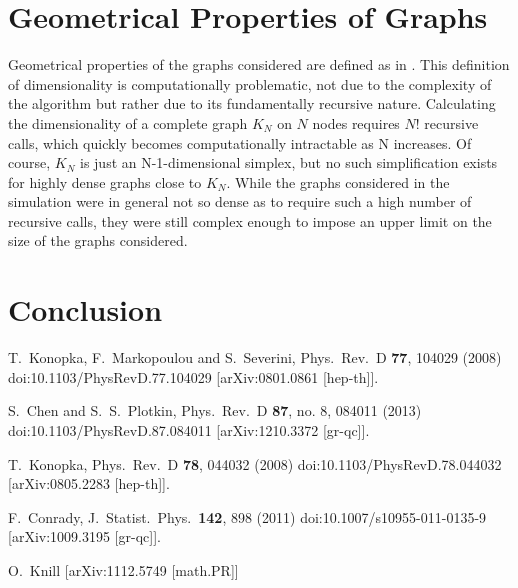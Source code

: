 \documentclass[prd,12pt,nofootinbib]{revtex4}
\begin{document}
\section{Geometrical Properties of Graphs}
Geometrical properties of the graphs considered are defined as in \cite{Knill:2011}. This definition of dimensionality is computationally problematic, not due to the complexity of the algorithm but rather due to its fundamentally recursive nature. Calculating the dimensionality of a complete graph $K_N$  on $N$ nodes requires $N!$ recursive calls, which quickly becomes computationally intractable as N increases. Of course, $K_N$ is just an N-1-dimensional simplex, but no such simplification exists for highly dense graphs close to $K_N$. While the graphs considered in the simulation were in general not so dense as to require such a high number of recursive calls, they were still complex enough to impose an upper limit on the size of the graphs considered.
\section{Conclusion}  
\begin{thebibliography}{99}
  


  T.~Konopka, F.~Markopoulou and S.~Severini,
  Phys.\ Rev.\ D {\bf 77}, 104029 (2008)
  doi:10.1103/PhysRevD.77.104029
  [arXiv:0801.0861 [hep-th]].

  S.~Chen and S.~S.~Plotkin,
  Phys.\ Rev.\ D {\bf 87}, no. 8, 084011 (2013)
  doi:10.1103/PhysRevD.87.084011
  [arXiv:1210.3372 [gr-qc]].


  T.~Konopka,
  Phys.\ Rev.\ D {\bf 78}, 044032 (2008)
  doi:10.1103/PhysRevD.78.044032
  [arXiv:0805.2283 [hep-th]].

  F.~Conrady,
  J.\ Statist.\ Phys.\  {\bf 142}, 898 (2011)
  doi:10.1007/s10955-011-0135-9
  [arXiv:1009.3195 [gr-qc]].
  
   O.~Knill
   [arXiv:1112.5749 [math.PR]]
  
  
 
\end{thebibliography}
\end{document}
